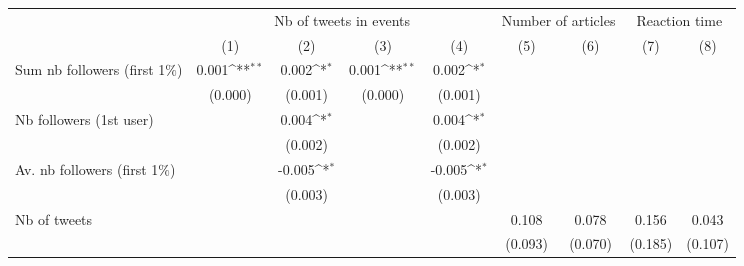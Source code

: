 {
\def\sym#1{\ifmmode^{#1}\else\(^{#1}\)\fi}
\begin{tabular}{l*{8}{c}}
\hline\hline
                    &\multicolumn{4}{c}{Nb of tweets in events}                                             &\multicolumn{2}{c}{Number of articles}     &\multicolumn{2}{c}{Reaction time}          \\\cmidrule(lr){2-5}\cmidrule(lr){6-7}\cmidrule(lr){8-9}
                    &\multicolumn{1}{c}{(1)}         &\multicolumn{1}{c}{(2)}         &\multicolumn{1}{c}{(3)}         &\multicolumn{1}{c}{(4)}         &\multicolumn{1}{c}{(5)}         &\multicolumn{1}{c}{(6)}         &\multicolumn{1}{c}{(7)}         &\multicolumn{1}{c}{(8)}         \\
\hline
Sum nb followers (first 1$\%$)&       0.001\sym{**} &       0.002\sym{*}  &       0.001\sym{**} &       0.002\sym{*}  &                     &                     &                     &                     \\
                    &     (0.000)         &     (0.001)         &     (0.000)         &     (0.001)         &                     &                     &                     &                     \\
Nb followers (1st user)&                     &       0.004\sym{*}  &                     &       0.004\sym{*}  &                     &                     &                     &                     \\
                    &                     &     (0.002)         &                     &     (0.002)         &                     &                     &                     &                     \\
Av. nb followers (first 1$\%$)&                     &      -0.005\sym{*}  &                     &      -0.005\sym{*}  &                     &                     &                     &                     \\
                    &                     &     (0.003)         &                     &     (0.003)         &                     &                     &                     &                     \\
Nb of tweets        &                     &                     &                     &                     &       0.108         &       0.078         &       0.156         &       0.043         \\
                    &                     &                     &                     &                     &     (0.093)         &     (0.070)         &     (0.185)         &     (0.107)         \\

\end{tabular}}
